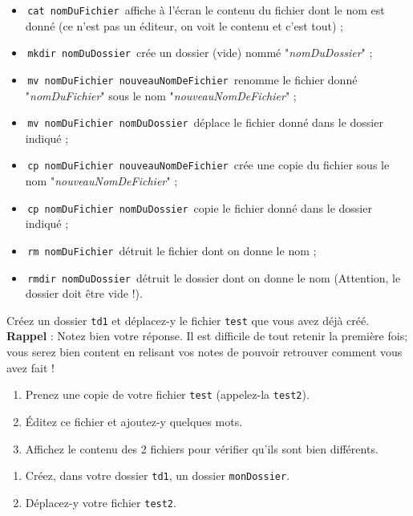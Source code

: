 \documentclass[a4paper,11pt]{article}
\begin{document}
\begin{itemize}
\item \,\verb|cat nomDuFichier|\,
affiche \`a l'\'ecran le contenu du fichier dont le nom est donn\'e (ce n'est pas un \'editeur, on voit le contenu et c'est tout) ;
\item \,\verb|mkdir nomDuDossier|\, cr\'ee un dossier (vide) nomm\'e "\textit{nomDuDossier}" ;
\item \,\verb|mv nomDuFichier nouveauNomDeFichier|\, renomme le fichier donn\'e "\textit{nomDuFichier}" sous le nom "\textit{nouveauNomDeFichier}" ;
\item \,\verb|mv nomDuFichier nomDuDossier|\, d\'eplace le fichier donn\'e dans le dossier indiqu\'e ;
\item \,\verb|cp nomDuFichier nouveauNomDeFichier|\, cr\'ee une copie du fichier sous le nom "\textit{nouveauNomDeFichier}" ;
\item \,\verb|cp nomDuFichier nomDuDossier|\, copie le fichier donn\'e dans le dossier indiqu\'e ;
\item \,\verb|rm nomDuFichier|\, d\'etruit le fichier dont on donne le nom ;
\item \,\verb|rmdir nomDuDossier|\, d\'etruit le dossier dont on donne le nom (Attention, le dossier doit \^etre vide !).
\end{itemize}



\begin{Exercice}{}
Cr\'eez un dossier \verb_td1_ et d\'eplacez-y le fichier \verb_test_ que vous avez d\'ej\`a cr\'e\'e.
\textbf{Rappel} : Notez bien votre r\'eponse. Il est difficile de tout retenir la premi\`ere fois; vous serez bien content en relisant vos notes de pouvoir retrouver comment vous avez fait !
\end{Exercice}	
		
\begin{Exercice}{}
\begin{enumerate}
\item Prenez une copie de votre fichier \verb_test_ (appelez-la \verb_test2_).
\item \'Editez ce fichier et ajoutez-y quelques mots.
\item Affichez le contenu des 2 fichiers pour v\'erifier qu'ils sont bien diff\'erents.
\end{enumerate}
\end{Exercice}
				
\begin{Exercice}{}
\begin{enumerate}
\item Cr\'eez, dans votre dossier \verb_td1_, un dossier \verb_monDossier_.
\item D\'eplacez-y votre fichier \verb_test2_.
\end{enumerate}
\end{Exercice}	
\end{document}
